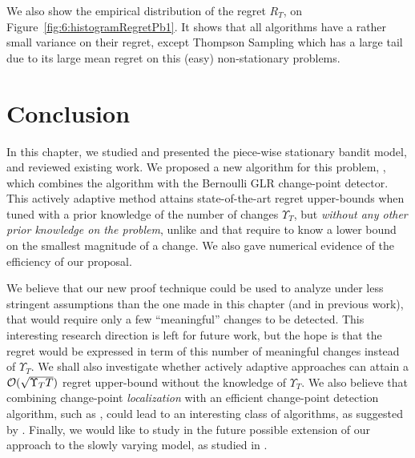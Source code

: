 We also show the empirical distribution of the regret $R_T$, on Figure~\ref{fig:6:histogramRegretPb1}. It shows that all algorithms have a rather small variance on their regret, except Thompson Sampling which has a large tail due to its large mean regret on this (easy) non-stationary problems.


\newpage
\section{Conclusion}
\label{sub:6:conclusion}

In this chapter, we studied and presented the piece-wise stationary bandit model, and reviewed existing work.
%
We proposed a new algorithm for this problem, \GLRklUCB, which combines the \klUCB{} algorithm with the Bernoulli GLR change-point detector. This actively adaptive method attains state-of-the-art regret upper-bounds when tuned with a prior knowledge of the number of changes $\Upsilon_T$, but \emph{without any other prior knowledge on the problem}, unlike \CUSUMUCB{} and \MUCB{} that require to know a lower bound on the smallest magnitude of a change. We also gave numerical evidence of the efficiency of our proposal.

We believe that our new proof technique could be used to analyze \GLRklUCB{} under less stringent assumptions than the one made in this chapter (and in previous work), that would require only a few ``meaningful'' changes to be detected. This interesting research direction is left for future work,  but the hope is that the regret would be expressed in term of this number of meaningful changes instead of $\Upsilon_T$. We shall also investigate whether actively adaptive approaches can attain a $\mathcal{O}(\sqrt{\Upsilon_T T})$ regret upper-bound without the knowledge of $\Upsilon_T$.
We also believe that combining change-point \emph{localization} with an efficient change-point detection algorithm, such as \GLRklUCB, could lead to an interesting class of algorithms, as suggested by \cite{Maillard2018GLR}.
Finally, we would like to study in the future possible extension of our approach to the slowly varying model, as studied in \cite{Besbes14stochastic,WeiSrivastava18Abruptly}.

